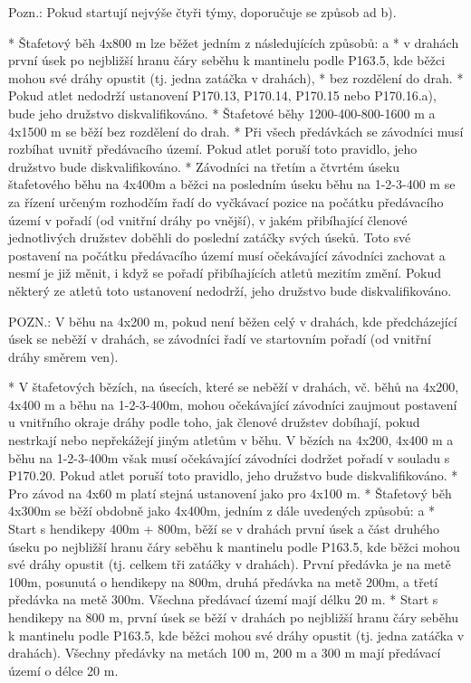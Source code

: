 Pozn.: Pokud startují nejvýše čtyři týmy, doporučuje se způsob ad b).

* Štafetový běh 4x800 m lze běžet jedním z následujících způsobů:
  \begitems \style a
  * v drahách první úsek po nejbližší hranu čáry seběhu k mantinelu podle P163.5, kde běžci mohou své dráhy opustit (tj. jedna zatáčka v drahách),
  * bez rozdělení do drah.
  \enditems
* Pokud atlet nedodrží ustanovení P170.13, P170.14, P170.15 nebo P170.16.a), bude jeho družstvo diskvalifikováno.
* Štafetové běhy 1200-400-800-1600 m a 4x1500 m se běží bez rozdělení do drah.
* Při všech předávkách se závodníci musí rozbíhat uvnitř předávacího území. Pokud atlet poruší toto pravidlo, jeho družstvo bude diskvalifikováno.
* Závodníci na třetím a čtvrtém úseku štafetového běhu na 4x400m a běžci na posledním úseku běhu na 1-2-3-400 m se za řízení určeným rozhodčím řadí do vyčkávací pozice na počátku předávacího území v pořadí (od vnitřní dráhy po vnější), v jakém přibíhající členové jednotlivých družstev doběhli do poslední zatáčky svých úseků. Toto své postavení na počátku předávacího území musí očekávající závodníci zachovat a nesmí je již měnit, i když se pořadí přibíhajících atletů mezitím změní. Pokud některý ze atletů toto ustanovení nedodrží, jeho družstvo bude diskvalifikováno.

POZN.: V běhu na 4x200 m, pokud není běžen celý v drahách, kde předcházející úsek se neběží v drahách, se závodníci řadí ve startovním pořadí (od vnitřní dráhy směrem ven).

* V štafetových bězích, na úsecích, které se neběží v drahách, vč. běhů na 4x200, 4x400 m a běhu na 1-2-3-400m, mohou očekávající závodníci zaujmout postavení u vnitřního okraje dráhy podle toho, jak členové družstev dobíhají, pokud nestrkají nebo nepřekážejí jiným atletům v běhu. V bězích na 4x200, 4x400 m a běhu na 1-2-3-400m však musí očekávající závodníci dodržet pořadí v souladu s P170.20. Pokud atlet poruší toto pravidlo, jeho družstvo bude diskvalifikováno.
* Pro závod na 4x60 m platí stejná ustanovení jako pro 4x100 m.
* Štafetový běh 4x300m se běží obdobně jako 4x400m, jedním z dále uvedených způsobů:
  \begitems \style a
  * Start s hendikepy 400m + 800m, běží se v drahách první úsek a část druhého úseku po nejbližší hranu čáry seběhu k mantinelu podle P163.5, kde běžci mohou své dráhy opustit (tj. celkem tři zatáčky v drahách). První předávka je na metě 100m, posunutá o hendikepy na 800m, druhá předávka na metě 200m, a třetí předávka na metě 300m. Všechna předávací území mají délku 20 m.
  * Start s hendikepy na 800 m, první úsek se běží v drahách po nejbližší hranu čáry seběhu k mantinelu podle P163.5, kde běžci mohou své dráhy opustit (tj. jedna zatáčka v drahách). Všechny předávky na metách 100 m, 200 m a 300 m mají předávací území o délce 20 m.
  \enditems

